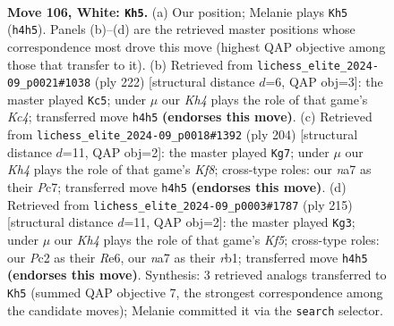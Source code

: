 \documentclass[11pt]{article}
\begin{document}
\clearpage

\begin{figure}[p]\centering
\begin{subfigure}{0.46\textwidth}\centering
\resizebox{\linewidth}{!}{%
\newchessgame
\chessboard[
  setfen={B7/n5k1/8/6P1/7K/7P/2P5/8 w - - 0 106},
  showmover=false,
  pgfstyle=straightmove, color=movearrow, markmove={h4-h5}
]}
\caption{}
\end{subfigure}\hfill
\begin{subfigure}{0.46\textwidth}\centering
\resizebox{\linewidth}{!}{%
\newchessgame
\chessboard[
  setfen={8/2k5/8/PP6/2K5/2P5/8/8 w - - 1 112},
  showmover=false,
  pgfstyle=straightmove, color=movearrow, markmove={c4-c5}
]}
\caption{}
\end{subfigure}
\\[4pt]
\begin{subfigure}{0.46\textwidth}\centering
\resizebox{\linewidth}{!}{%
\newchessgame
\chessboard[
  setfen={5K2/2P2P2/p7/8/5k2/P7/8/8 w - - 0 103},
  showmover=false,
  pgfstyle=straightmove, color=movearrow, markmove={f8-g7}
]}
\caption{}
\end{subfigure}\hfill
\begin{subfigure}{0.46\textwidth}\centering
\resizebox{\linewidth}{!}{%
\newchessgame
\chessboard[
  setfen={8/8/4r3/5p2/5k2/5p2/8/1R3K2 b - - 73 108},
  showmover=false,
  pgfstyle=straightmove, color=movearrow, markmove={f4-g3}
]}
\caption{}
\end{subfigure}
\caption{\textbf{Move 106, White: \texttt{Kh5}.} (a) Our position; Melanie plays \texttt{Kh5} (\texttt{h4h5}). Panels (b)--(d) are the retrieved master positions whose correspondence most drove this move (highest QAP objective among those that transfer to it). (b) Retrieved from \texttt{lichess\_elite\_2024-09\_p0021\#1038} (ply 222) [structural distance $d$=6, QAP obj=3]: the master played \texttt{Kc5}; under $\mu$ our \emph{Kh4} plays the role of that game's \emph{Kc4}; transferred move \texttt{h4h5} \textbf{(endorses this move)}. (c) Retrieved from \texttt{lichess\_elite\_2024-09\_p0018\#1392} (ply 204) [structural distance $d$=11, QAP obj=2]: the master played \texttt{Kg7}; under $\mu$ our \emph{Kh4} plays the role of that game's \emph{Kf8}; cross-type roles: our \emph{n}a7 as their \emph{P}c7; transferred move \texttt{h4h5} \textbf{(endorses this move)}. (d) Retrieved from \texttt{lichess\_elite\_2024-09\_p0003\#1787} (ply 215) [structural distance $d$=11, QAP obj=2]: the master played \texttt{Kg3}; under $\mu$ our \emph{Kh4} plays the role of that game's \emph{Kf5}; cross-type roles: our \emph{P}c2 as their \emph{R}e6, our \emph{n}a7 as their \emph{r}b1; transferred move \texttt{h4h5} \textbf{(endorses this move)}. Synthesis: 3 retrieved analogs transferred to \texttt{Kh5} (summed QAP objective 7, the strongest correspondence among the candidate moves); Melanie committed it via the \texttt{search} selector.}
\label{fig:thought-m210}
\end{figure}
\end{document}

